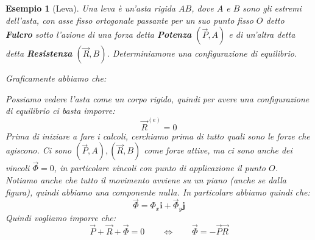 \documentclass[11pt,a4paper,twoside]{article}
\newtheorem{es}{Esempio}
\theoremstyle{definition}
\begin{document}
\begin{es}[Leva]
	Una leva è un'asta rigida $AB$, dove $A$ e $B$ sono gli estremi dell'asta, con asse fisso ortogonale passante per un suo punto fisso $O$ detto \textbf{Fulcro} sotto l'azione di una forza detta \textbf{Potenza} $(\vec P, A)$ e di un'altra detta detta \textbf{Resistenza} $(\vec R, B)$. Determiniamone una configurazione di equilibrio.

	Graficamente abbiamo che:
	\begin{center}
	\end{center}
	Possiamo vedere l'asta come un corpo rigido, quindi per avere una configurazione di equilibrio ci basta imporre:
	\[ \vec R^{(e)} = 0 \]
	Prima di iniziare a fare i calcoli, cerchiamo prima di tutto quali sono le forze che agiscono. Ci sono $(\vec P,A),(\vec R,B)$ come forze attive, ma ci sono anche dei vincoli $\vec \Phi = 0$, in particolare vincoli con punto di applicazione il punto $O$. Notiamo anche che tutto il movimento avviene su un piano (anche se dalla figura), quindi abbiamo una componente nulla. In particolare abbiamo quindi che:
	\[ \vec \Phi = \Phi_x \mathbf i + \vec \Phi_y \mathbf j \]
	Quindi vogliamo imporre che:
	\[ \vec P + \vec R + \vec \Phi = 0 \qquad \Leftrightarrow \qquad \vec \Phi = -\vec P \vec R\]


\end{es}
\end{document}
